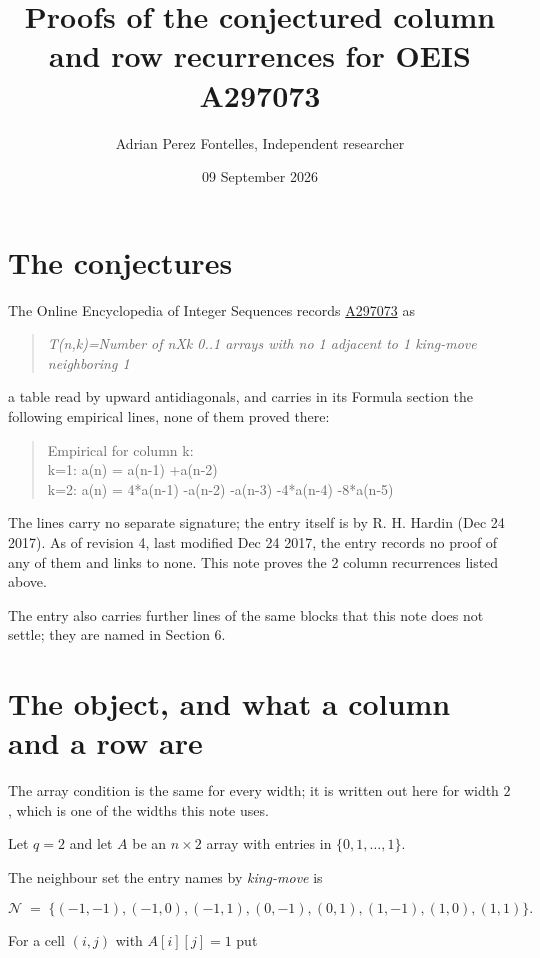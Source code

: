\documentclass[11pt]{article}
\title{Proofs of the conjectured column and row recurrences for OEIS A297073}
\author{Adrian Perez Fontelles, Independent researcher}
\date{09 September 2026}
\theoremstyle{definition}
\begin{document}
\maketitle
\section{The conjectures}

The Online Encyclopedia of Integer Sequences records \href{https://oeis.org/A297073}{A297073} as

\begin{quote}\itshape T(n,k)=Number of nXk 0..1 arrays with no 1 adjacent to 1 king-move neighboring 1\end{quote}

a table read by upward antidiagonals, and carries in its Formula section the following empirical lines, none of them proved there:

\begin{quote}\ttfamily Empirical for column k:\\
k=1: a(n) = a(n-1) +a(n-2)\\k=2: a(n) = 4*a(n-1) -a(n-2) -a(n-3) -4*a(n-4) -8*a(n-5)\end{quote}

The lines carry no separate signature; the entry itself is by R. H. Hardin (Dec 24 2017). As of revision 4, last modified Dec 24 2017, the entry records no proof of any of them and links to none. This note proves the 2 column recurrences listed above.

The entry also carries further lines of the same blocks that this note does not settle; they are named in Section 6.

\section{The object, and what a column and a row are}

The array condition is the same for every width; it is written out here for width $2$, which is one of the widths this note uses.

Let $q = 2$ and let $A$ be an $n \times 2$ array with entries in $\{0,1,\dots,1\}$.

The neighbour set the entry names by {\itshape king-move} is

\[\mathcal{N} \;=\; \{(-1,-1), (-1,0), (-1,1), (0,-1), (0,1), (1,-1), (1,0), (1,1)\}.\]

For a cell $(i,j)$ with $A[i][j] = 1$ put
\end{document}
